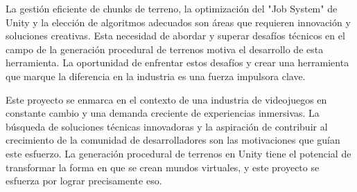 La gestión eficiente de chunks de terreno, la optimización del "Job System" de Unity y la elección de algoritmos adecuados son áreas que requieren innovación y soluciones creativas. Esta necesidad de abordar y superar desafíos técnicos en el campo de la generación procedural de terrenos motiva el desarrollo de esta herramienta. La oportunidad de enfrentar estos desafíos y crear una herramienta que marque la diferencia en la industria es una fuerza impulsora clave.

Este proyecto se enmarca en el contexto de una industria de videojuegos en constante cambio y una demanda creciente de experiencias inmersivas. La búsqueda de soluciones técnicas innovadoras y la aspiración de contribuir al crecimiento de la comunidad de desarrolladores son las motivaciones que guían este esfuerzo. La generación procedural de terrenos en Unity tiene el potencial de transformar la forma en que se crean mundos virtuales, y este proyecto se esfuerza por lograr precisamente eso.
\newpage
